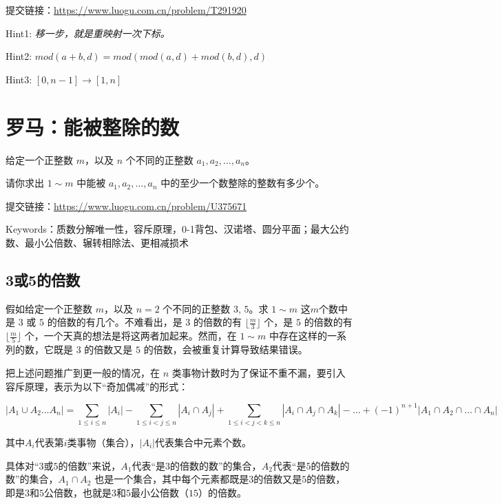 \documentclass[12pt]{ctexart}
\begin{document}
提交链接：\url{https://www.luogu.com.cn/problem/T291920}\newline

\newpage
Hint1: \textit{移一步，就是重映射一次下标。}\newline

Hint2: \textit{$mod(a+b, d) = mod(mod(a, d) + mod(b, d), d)$}\newline

Hint3: \textit{$[0, n-1] \rightarrow [1, n]$ }

\newpage
\section{罗马：能被整除的数}
给定一个正整数 $m$，以及 $n$ 个不同的正整数 $a_1, a_2, \dots, a_n$。

请你求出 $1 \sim m$ 中能被 $a_1, a_2, \dots, a_n$ 中的至少一个数整除的整数有多少个。\newline

提交链接：\url{https://www.luogu.com.cn/problem/U375671}

Keywords：质数分解唯一性，容斥原理，0-1背包、汉诺塔、圆分平面；最大公约数、最小公倍数、辗转相除法、更相减损术

\subsection{3或5的倍数}

假如给定一个正整数 $m$，以及 $n = 2$ 个不同的正整数 $3$, $5$。求 $1 \sim m$ 这$m$个数中是 $3$ 或 $5$ 的倍数的有几个。不难看出，是 $3$ 的倍数的有 $\lfloor \frac{m}{3} \rfloor$ 个，是 $5$ 的倍数的有 $\lfloor \frac{m}{5} \rfloor$ 个，一个天真的想法是将这两者加起来。然而，在 $1 \sim m$ 中存在这样的一系列的数，它既是 $3$ 的倍数又是 $5$ 的倍数，会被重复计算导致结果错误。

把上述问题推广到更一般的情况，在 $n$ 类事物计数时为了保证不重不漏，要引入容斥原理，表示为以下“奇加偶减”的形式：

$$|A_1 \cup A_2 \ldots A_n| = \sum_{1\le i\le n} |A_i| - \sum_{1\le i < j \le n} |A_i \cap A_j| + \sum_{1\le i < j < k \le n} |A_i \cap A_j \cap A_k|- \ldots + (-1)^{n+1} |A_1 \cap A_2 \cap \ldots \cap A_n|$$

其中$A_i$代表第$i$类事物（集合），$|A_i|$代表集合中元素个数。\newline

具体对“$3$或$5$的倍数”来说，$A_1$代表“是$3$的倍数的数”的集合，$A_2$代表“是$5$的倍数的数”的集合，$A_1 \cap A_2$ 也是一个集合，其中每个元素都既是$3$的倍数又是$5$的倍数，即是$3$和$5$公倍数，也就是$3$和$5$最小公倍数（$15$）的倍数。\newline
\end{document}
